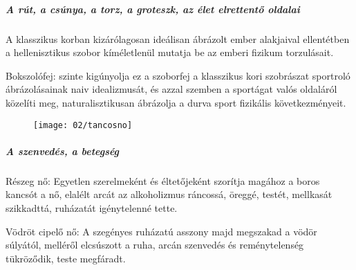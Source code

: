 	\subparagraph{A rút, a csúnya, a torz, a groteszk, az élet elrettentő oldalai}
	
	A klasszikus korban kizárólagosan ideálisan ábrázolt ember alakjaival ellentétben a hellenisztikus szobor kíméletlenül mutatja be az emberi fizikum torzulásait.
	
	Bokszolófej: szinte kigúnyolja ez a szoborfej a klasszikus kori szobrászat sportroló ábrázolásainak naiv idealizmusát, és azzal szemben a sportágat valós oldaláról közelíti meg, naturalisztikusan ábrázolja a durva sport fizikális következményeit.
	
	\begin{figure}[H]
		\begin{minipage}{0.3\textwidth}
		\end{minipage}
		\hfill
		\begin{minipage}{0.33\textwidth}
			\begin{tcolorbox}[enhanced,colframe=gray!50!white,
				colbacktitle=gray!15!white,
				coltitle=gray!50!black,
				borderline={0.5mm}{0mm}{gray!15!white},
				borderline={0.5mm}{0mm}{gray!50!white,dashed},
				attach boxed title to top center={yshift=-2mm},
				boxed title style={boxrule=0.4pt},
				title=Táncosnő]{
					\texttt{[image: 02/tancosno]}
				}			
			\end{tcolorbox}
		\end{minipage}
		\hfill
		\begin{minipage}{0.3\textwidth}
		\end{minipage}	
	\end{figure}

	\subparagraph{A szenvedés, a betegség}
	
	Részeg nő: Egyetlen szerelmeként és éltetőjeként szorítja magához a boros kancsót a nő, elalélt arcát az alkoholizmus ráncossá, öreggé, testét, mellkasát szikkadttá, ruházatát igénytelenné tette.
	
	Vödröt cipelő nő: A szegényes ruházatú asszony majd megszakad a vödör súlyától, melléről elcsúszott a ruha, arcán szenvedés és reménytelenség tükröződik, teste megfáradt.
	
